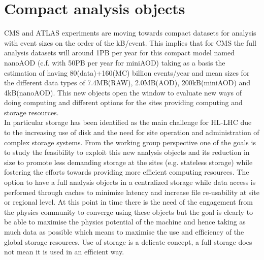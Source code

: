 \section{Compact analysis objects}
CMS and ATLAS experiments are moving towards compact datasets for analysis with event sizes on the order of the kB/event. This implies that for CMS the full analysis datasets will around 1PB per year for this compact model named nanoAOD (c.f. with 50PB per year for miniAOD) taking as a basis the estimation of having 80(data)+160(MC) billion events/year and mean sizes for the different data types of 7.4MB(RAW), 2.0MB(AOD), 200kB(miniAOD) and 4kB(nanoAOD).
This new objects open the window to evaluate new ways of doing computing and different options for the sites providing computing and storage resources.\\
In particular storage has been identified as the main challenge for HL-LHC due to the increasing use of disk and the need for site operation and administration of complex storage systems. From the working group perspective one of the goals is to study the feasibility to exploit this new analysis objects and its reduction in size to promote less demanding storage at the sites (e.g. stateless storage) while fostering the efforts towards providing more efficient computing resources. The option to have a full analysis objects in a centralized storage while data access is performed through caches to minimize latency and increase file re-usability at site or regional level. At this point in time there is the need of the engagement from the physics community to converge using these objects but the goal is clearly to be able to maximise the physics potential of the machine and hence taking as much data as possible which means to maximise the use and efficiency of the global storage resources. Use of storage is a delicate concept, a full storage does not mean it is used in an efficient way.\\
